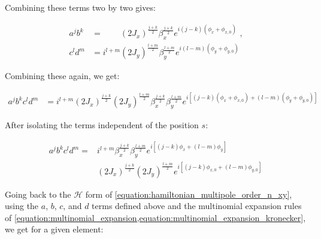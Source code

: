 Combining these terms two by two gives:

\begin{equation}
    \begin{aligned}
        a^j b^k &= \phantom{i^{l+m}} (2J_x)^{\frac{j+k}{2}} \beta_x^{\frac{j+k}{2}} e^{i \left(j-k\right) \left(\phi_x + \phi_{x,0}\right)} \text{ ,} \\
        c^l d^m &= i^{l+m}           (2J_y)^{\frac{l+m}{2}} \beta_y^{\frac{l+m}{2}} e^{i \left(l-m\right) \left(\phi_y + \phi_{y,0}\right)}
    \end{aligned}
    \label{equation:ab_cd_combining}
\end{equation}

Combining these again, we get:

\begin{equation}
    \begin{aligned}
        a^j b^k c^l d^m &= i^{l+m} 
                   (2J_x)^{\frac{j+k}{2}} (2J_y)^{\frac{l+m}{2}} 
                   \beta_x^{\frac{j+k}{2}} \beta_y^{\frac{l+m}{2}} 
                   e^{i\left[ (j-k)(\phi_x + \phi_{x,0}) + (l-m)(\phi_y + \phi_{y,0}) \right]}
    \end{aligned}
\end{equation}

After isolating the terms independent of the position \(s\):

\begin{equation}
    \begin{aligned}
        a^j b^k c^l d^m = & i^{l+m} \beta_x^{\frac{j+k}{2}} \beta_y^{\frac{l+m}{2}} e^{i\left[ \left(j-k\right) \phi_x + \left(l-m\right)\phi_y \right]} \\
                          & \left(2 J_x\right)^{\frac{j+k}{2}} \left(2 J_y\right)^{\frac{l+m}{2}} e^{ i\left[ \left(j-k\right) \phi_{x,0} + \left(l-m\right) \phi_{y,0} \right]}
    \end{aligned}
\end{equation}

Going back to the \(\mathcal{H}\) form of \cref{equation:hamiltonian_multipole_order_n_xy}, using the \(a\), \(b\), \(c\), and \(d\) terms defined above and the multinomial expansion rules of \cref{equation:multinomial_expansion,equation:multinomial_expansion_kronecker}, we get for a given element:

